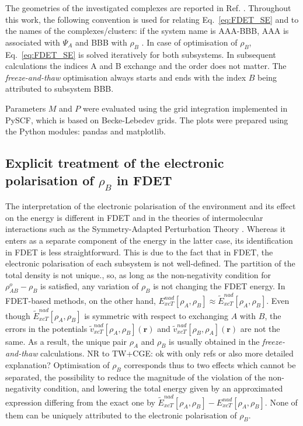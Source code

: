 \documentclass[amsmath,amssymb,preprint,aip,jcp]{revtex4-1}
\newcommand{\nr}[1]{\color{red}#1\color{black}}
\begin{document}
\nr{
The geometries of the investigated complexes are reported in Ref. \citenum{Zech2018}. }
Throughout this work, the following convention is used for relating Eq.~\ref{eq:FDET_SE} and to the names of the complexes/clusters: if the system name is AAA-BBB, AAA is associated with $\Psi_A$ and BBB with $\rho_B$ .
In case of optimisation of $\rho_B$, \nr{Eq.~\ref{eq:FDET_SE} } is solved 
iteratively for both subsystems. In subsequent  calculations the indices A and B exchange and the order does not matter.
The \textit{freeze-and-thaw} optimisation \nr{always starts and ends with the index $B$ being attributed to subsystem BBB}. 
 
Parameters $M$ and $P$ were evaluate\nr{d } using the grid integration implemented in PySCF\cite{PYSCF}\nr{, which is based on Becke\cite{Becke1988b}-Lebedev\cite{Lebedev1999} grids}. 
The plots were prepared using the Python modules: pandas\cite{PANDAS} and matplotlib\cite{Hunter2007}.

\subsection{Explicit treatment of the electronic polarisation of $\rho_B$ in FDET}\label{sect:pol_treat}
The interpretation of the electronic polarisation of the environment and its effect on the energy is different in FDET and in the theories of intermolecular interactions such as the Symmetry-Adapted Perturbation Theory \cite{Jeziorski1994}. Whereas it enters as a separate component of the energy in the latter case, its identification in FDET is less straightforward.
\nr{This is due to } the fact that in FDET, the electronic polarisation of each subsystem is not well-defined.\cite{HumbertDroz2014} The partition of the total density is not unique.\cite{Savin2009}, so, as long as the non-negativity condition for $\rho^{o}_{AB}-\rho_B$ is satisfied, any \nr{variation } of $\rho_B$ is not changing the FDET energy.
In FDET\nr{-}based methods, on the other hand,  ${E}_{xcT}^{nad}[\rho_A,\rho_B]\approx \tilde{E}_{xcT}^{nad}[\rho_A,\rho_B]$. 
Even though $\tilde{E}_{xcT}^{nad}[\rho_A,\rho_B]$
is symmetric with respect to exchanging $A$ with $B$, 
the errors in the potentials  $\tilde{v}_{xcT}^{nad}[\rho_A,\rho_B](\mathbf{r})$ and  $\tilde{v}_{xcT}^{nad}[\rho_B,\rho_A](\mathbf{r})$
 are not the same. 
As a result, the unique pair $\rho_A$ and  $\rho_B$ is usually obtained in the \textit{freeze-and-thaw} calculations.\cite{Wesolowski2015,Wesolowski1997a,Dulak2007a} 
\nr{NR to TW+CGE: ok with only refs or also more detailed explanation? } 
Optimisation of $\rho_B$  corresponds thus to two effects which cannot be separated, the possibility to reduce the magnitude of the violation of the non-negativity condition, and lowering the total energy given by an approximated expression differing from the exact one by  $\tilde{E}_{xcT}^{nad}[\rho_A,\rho_B]-{E}_{xcT}^{nad}[\rho_A,\rho_B]$. None of them can be uniquely attributed to the electronic polarisation of $\rho_B$. 
\end{document}
